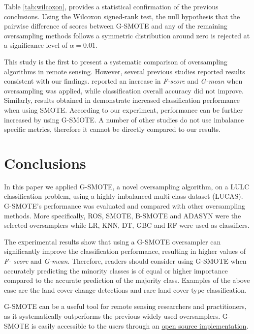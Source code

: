 \documentclass[remotesensing,article,submit,moreauthors,pdftex]{Definitions/mdpi}
\begin{document}
Table \ref{tab:wilcoxon}, provides a statistical confirmation of the previous conclusions. Using the Wilcoxon signed-rank test, the null hypothesis that the pairwise difference of scores between G-SMOTE and any of the remaining oversampling methods follows a symmetric distribution around zero is rejected at a significance level of $\alpha = 0.01$. 

This study is the first to present a systematic comparison of oversampling
algorithms in remote sensing. However, several previous studies reported results
consistent with our findings. \cite{Bogner2018} reported an increase in
\textit{F-score} and \textit{G-mean} when oversampling was applied, while
classification overall accuracy did not improve. Similarly, results obtained in
\cite{Feng2019} demonstrate increased classification performance when using
SMOTE. According to our experiment, performance can be further increased by
using G-SMOTE. A number of other studies \cite{Cenggoro2018, Maxwell2018} do not
use imbalance specific metrics, therefore it cannot be directly compared to our
results.

\section{Conclusions}

In this paper we applied G-SMOTE, a novel oversampling algorithm, on a LULC
classification problem, using a highly imbalanced multi-class dataset (LUCAS).
G-SMOTE's performance was evaluated and compared with other oversampling
methods. More specifically, ROS, SMOTE, B-SMOTE and ADASYN were the selected
oversamplers while LR, KNN, DT, GBC and RF were used as classifiers.

The experimental results show that using a G-SMOTE oversampler can significantly
improve the classification performance, resulting in higher values of \textit{F-
score} and \textit{G-mean}. Therefore, readers should consider using G-SMOTE
when accurately predicting the minority classes is of equal or higher importance
compared to the accurate prediction of the majority class. Examples of the above
case are the land cover change detections and rare land cover type
classification.

G-SMOTE can be a useful tool for remote sensing researchers and practitioners,
as it systematically outperforms the previous widely used oversamplers.
G-SMOTE is easily accessible to the users through an
\href{https://geometric-smote.readthedocs.io/en/latest/?badge=latest}{open
	source implementation}.
\end{document}
